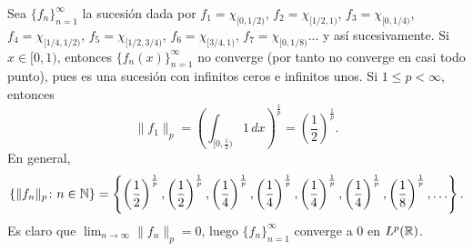 \documentclass[a4paper, 11pt, oneside]{report}
\begin{document}
\begin{example}\label{eje:1.8.8}
  Sea $\{f_n\}_{n=1}^\infty$ la sucesión dada por $f_1 = \chi_{[0,1/2)}$, $f_2 = \chi_{[1/2,1)}$, $f_3 = \chi_{[0,1/4)}$, $f_4 = \chi_{[1/4,1/2)}$, $f_5 = \chi_{[1/2,3/4)}$, $f_6 = \chi_{[3/4,1)}$, $f_7 = \chi_{[0,1/8)}$... y así sucesivamente. Si $x \in [0,1)$, entonces $\{f_n(x)\}_{n=1}^\infty$ no converge (por tanto no converge en casi todo punto), pues es una sucesión con infinitos ceros e infinitos unos. Si $1 \leq p < \infty$, entonces
  \[\|f_1\|_p = \left(\int_{[0,\frac{1}{2})} 1 \, dx\right)^{\frac{1}{p}} = \left(\frac{1}{2}\right)^\frac{1}{p}.\]
  En general,
  \[\left\{\|f_n\|_p \colon n \in \mathbb N\right\} = \left\{\left(\frac{1}{2}\right)^{\frac{1}{p}},\left(\frac{1}{2}\right)^{\frac{1}{p}},\left(\frac{1}{4}\right)^{\frac{1}{p}},\left(\frac{1}{4}\right)^{\frac{1}{p}},\left(\frac{1}{4}\right)^{\frac{1}{p}},\left(\frac{1}{4}\right)^{\frac{1}{p}},\left(\frac{1}{8}\right)^{\frac{1}{p}},\mathellipsis\right\}.\]
  Es claro que $\lim_{n \to \infty} \|f_n\|_p = 0$, luego $\{f_n\}_{n=1}^\infty$ converge a $0$ en $L^p(\mathbb R)$.


\end{example}
\end{document}
